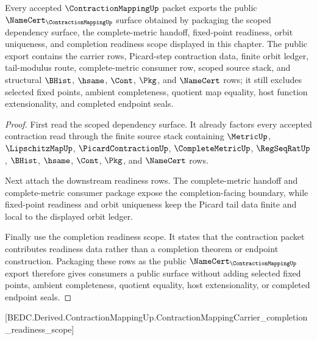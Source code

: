 \begin{theorem}
\label{thm:contraction-mapping-public-export}
Every accepted $\ContractionMappingUp$ packet exports the public $\NameCert_{\ContractionMappingUp}$ surface obtained by packaging the scoped dependency surface, the complete-metric handoff, fixed-point readiness, orbit uniqueness, and completion readiness scope displayed in this chapter. The public export contains the carrier rows, Picard-step contraction data, finite orbit ledger, tail-modulus route, complete-metric consumer row, scoped source stack, and structural $\BHist$, $\hsame$, $\Cont$, $\Pkg$, and $\NameCert$ rows; it still excludes selected fixed points, ambient completeness, quotient map equality, host function extensionality, and completed endpoint seals.
\end{theorem}
\begin{proof}
First read the scoped dependency surface. It already factors every accepted contraction read through the finite source stack containing $\MetricUp$, $\LipschitzMapUp$, $\PicardContractionUp$, $\CompleteMetricUp$, $\RegSeqRatUp$, $\BHist$, $\hsame$, $\Cont$, $\Pkg$, and $\NameCert$ rows.

Next attach the downstream readiness rows. The complete-metric handoff and complete-metric consumer package expose the completion-facing boundary, while fixed-point readiness and orbit uniqueness keep the Picard tail data finite and local to the displayed orbit ledger.

Finally use the completion readiness scope. It states that the contraction packet contributes readiness data rather than a completion theorem or endpoint construction. Packaging these rows as the public $\NameCert_{\ContractionMappingUp}$ export therefore gives consumers a public surface without adding selected fixed points, ambient completeness, quotient equality, host extensionality, or completed endpoint seals.
\end{proof}

[BEDC.Derived.ContractionMappingUp.ContractionMappingCarrier\_completion\_readiness\_scope]

